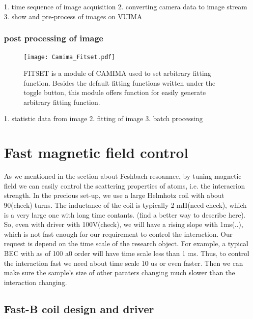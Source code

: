 1. time sequence of image acquisition
2. converting camera data to image stream
3. show and pre-process of images on VUIMA

\subsubsection{post processing of image}

\begin{figure}[htb]
\begin{center}
\texttt{[image: Camima\_Fitset.pdf]}
\end{center}
\caption[FITSET: a module of CAMIMA used to set arbitrary fitting function]{FITSET is a module of CAMIMA used to set arbitrary fitting function. Besides the default fitting functions written under the toggle button, this module offers function for easily generate arbitrary fitting function.}
\label{Camima_Fitset}
\end{figure}

1. statistic data from image
2. fitting of image
3. batch processing

\section{Fast magnetic field control}
\label{sec:fastcoil}

As we mentioned in the section about Feshbach resoannce, by tuning magnetic field we can easily control the scattering properties of atoms, i.e. the interacrion strength. In the precious set-up, we use a large Helmhotz coil with about 90(check) turns. The inductance of the coil is typically 2 mH(need check), which is a very large one with long time contants. (find a better way to describe here). So, even with driver with 100V(check), we will have a rising slope with 1ms(..), which is not fast enough for our requirement to control the interaction. Our request is depend on the time scale of the research object. For example, a typical BEC with as of 100 a0 order will have time scale less than 1 ms. Thus, to control the interaction fast we need about time scale 10 us or even faster. Then we can make sure the sample's size of other paraters changing much slower than the interaction changing.

\subsection{Fast-B coil design and driver}

